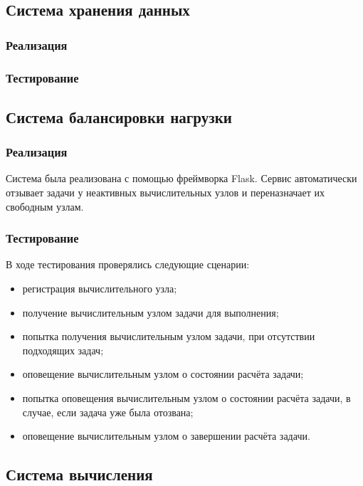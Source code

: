 \documentclass[a4paper,12pt]{report}
\numberwithin{equation}{section}
\begin{document}
  \subsection{Система хранения данных}
  \subsubsection{Реализация}
  
  \subsubsection{Тестирование}
  
  \subsection{Система балансировки нагрузки}
  \subsubsection{Реализация}
  Система была реализована с помощью фреймворка Flask.
  Сервис автоматически отзывает задачи у неактивных вычислительных узлов и переназначает их свободным узлам.
  
  \subsubsection{Тестирование}
  В ходе тестирования проверялись следующие сценарии:
  
  \begin{itemize}
    \item регистрация вычислительного узла;
    \item получение вычислительным узлом задачи для выполнения;
    \item попытка получения вычислительным узлом задачи, при отсутствии подходящих задач;
    \item оповещение вычислительным узлом о состоянии расчёта задачи;
    \item попытка оповещения вычислительным узлом о состоянии расчёта задачи, в случае, если задача уже была отозвана;
    \item оповещение вычислительным узлом о завершении расчёта задачи.
  \end{itemize}
  
  \subsection{Система вычисления}
\end{document}

